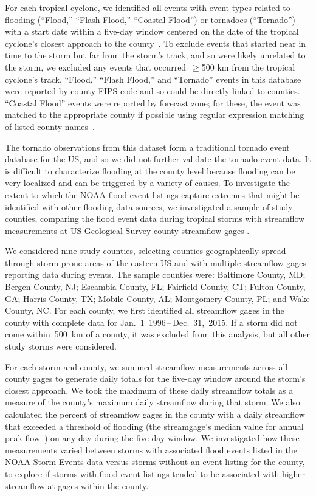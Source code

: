 For each tropical cyclone, we identified all events with event types related to
flooding (``Flood,'' ``Flash Flood,'' ``Coastal Flood'') or tornadoes
(``Tornado'') with a start date within a five-day window centered on the date
of the tropical cyclone's closest approach to the
county~\parencite{hurricaneexposuredata}. To exclude events that started near
in time to the storm but far from the storm's track, and so were likely
unrelated to the storm, we excluded any events that occurred~$\ge$500
\si{\kilo\metre} from the tropical cyclone's track. ``Flood,'' ``Flash Flood,''
and ``Tornado'' events in this database were reported by county \ac{FIPS} code
and so could be directly linked to counties.  ``Coastal Flood'' events were
reported by forecast zone; for these, the event was matched to the appropriate
county if possible using regular expression matching of listed county
names~\parencite{noaastormevents}. 

The tornado observations from this dataset form a traditional tornado event
database for the \ac{US}, and so we did not further validate
the tornado event data. It is difficult to characterize flooding at the county
level because flooding can be very localized and can be triggered by a variety
of causes. To investigate the extent to which the NOAA flood event listings
capture extremes that might be identified with other flooding data sources, we
investigated a sample of study counties, comparing the flood event data during
tropical storms with streamflow measurements at \ac{US} Geological Survey
county streamflow gages \parencite{usgsgages, countyfloods, dataRetrieval}.  

We considered nine study counties, selecting counties geographically spread
through storm-prone areas of the eastern \ac{US} and with multiple streamflow
gages reporting data during events. The sample counties were: Baltimore County,
MD; Bergen County, NJ; Escambia County, FL; Fairfield County, CT; Fulton
County, GA; Harris County, TX; Mobile County, AL; Montgomery County, PL; and
Wake County, NC. For each county, we first identified all streamflow gages in
the county with complete data for Jan.~1~1996\,--\,Dec.~31,~2015. If a storm
did not come within~500~\si{\kilo\metre} of a county, it was excluded from this
analysis, but all other study storms were considered. 

For each storm and county, we summed streamflow measurements across all county
gages to generate daily totals for the five-day window around the storm's
closest approach. We took the maximum of these daily streamflow totals as a
measure of the county's maximum daily streamflow during that storm. We also
calculated the percent of streamflow gages in the county with a daily
streamflow that exceeded a threshold of flooding (the streamgage's median value
for annual peak flow~\parencite{countyfloods}) on any day during the five-day
window. We investigated how these measurements varied between storms with
associated flood events listed in the NOAA Storm Events data versus storms without an
event listing for the county, to explore if storms with flood event listings
tended to be associated with higher streamflow at gages within the county.

